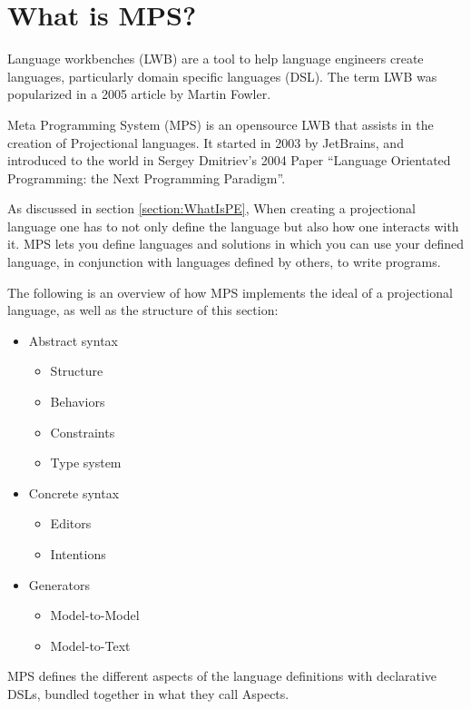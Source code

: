 \section{What is MPS?}

Language workbenches (LWB) are a tool to help language engineers create languages, particularly domain specific languages (DSL).
The term LWB was popularized in a 2005 article by Martin Fowler\cite{Fowler_lwb}.

Meta Programming System (MPS) is an opensource LWB that assists in the creation of Projectional languages.
It started in 2003 by JetBrains, and introduced to the world in Sergey Dmitriev's 2004 Paper ``Language Orientated Programming: the Next Programming Paradigm''\cite{dmitriev2004language}.

As discussed in section \ref{section:WhatIsPE}, When creating a projectional language one has to not only define the language but also how one interacts with it.
MPS lets you define languages and solutions in which you can use your defined language, in conjunction with languages defined by others, to write programs.

The following is an overview of how MPS implements the ideal of a projectional language, as well as the structure of this section: 

\begin{itemize}
    \item Abstract syntax
    \begin{itemize}
        \item Structure
        \item Behaviors
        \item Constraints
        \item Type system
    \end{itemize}
    \item Concrete syntax
    \begin{itemize}
        \item Editors
        \item Intentions
    \end{itemize}
    \item Generators
    \begin{itemize}
        \item Model-to-Model
        \item Model-to-Text
    \end{itemize}
\end{itemize}

MPS defines the different aspects of the language definitions with declarative DSLs, bundled together in what they call Aspects.

